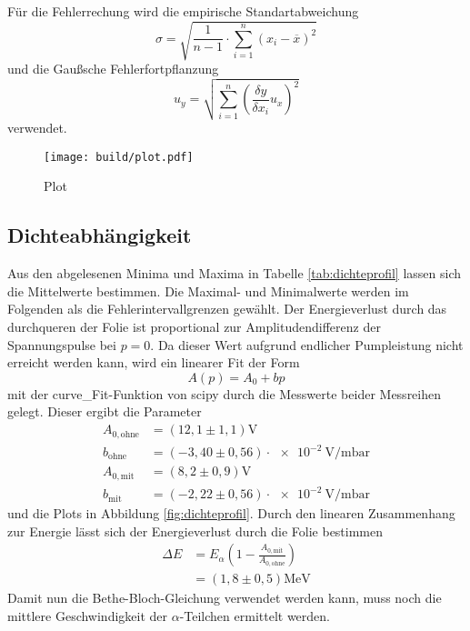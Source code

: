 Für die Fehlerrechung wird die empirische Standartabweichung
\begin{equation}
  \sigma = \sqrt{\frac{1}{n-1} \cdot \sum_{i=1}^n(x_i-\overline{x})^2}
  \label{eqn:Stdabweichung}
\end{equation}
und die Gaußsche Fehlerfortpflanzung
\begin{equation}
  u_y = \sqrt{\sum_{i=1}^n\left(\frac{\delta y}{\delta x_i}u_x\right)^2}
  \label{eqn:gauß}
\end{equation}
verwendet.
\begin{figure}
  \centering
  \texttt{[image: build/plot.pdf]}
  \caption{Plot}
  \label{fig:plot}
\end{figure}

\subsection{Dichteabhängigkeit}
Aus den abgelesenen Minima und Maxima in Tabelle \ref{tab:dichteprofil} lassen sich die Mittelwerte bestimmen.
Die Maximal- und Minimalwerte werden im Folgenden als die Fehlerintervallgrenzen gewählt.
Der Energieverlust durch das durchqueren der Folie ist proportional zur Amplitudendifferenz der Spannungspulse bei $p=0$.
Da dieser Wert aufgrund endlicher Pumpleistung nicht erreicht werden kann,
wird ein linearer Fit der Form
\begin{equation}
  A(p) = A_0 + bp
\end{equation}
mit der curve\_Fit-Funktion von scipy \cite{scipy} durch die Messwerte beider Messreihen gelegt.
Dieser ergibt die Parameter
\begin{align}
  A_{0,\text{ohne}} &= (12,1 \pm 1,1)\si{\volt}\\
  b_{\text{ohne}}   &= (-3,40 \pm 0,56)\cdot\SI{e-2}{\volt\per\milli\bar}\\
  A_{0,\text{mit}} &= (8,2 \pm 0,9)\si{\volt}\\
  b_{\text{mit}}   &= (-2,22 \pm 0,56)\cdot\SI{e-2}{\volt\per\milli\bar}
\end{align}
und die Plots in Abbildung \ref{fig:dichteprofil}.
Durch den linearen Zusammenhang zur Energie lässt sich der Energieverlust durch die Folie bestimmen
\begin{align}
  \Delta E &= E_{\alpha}\left(1-\frac{A_{0,\text{mit}}}{A_{0,\text{ohne}}}\right)\\
           &= (1,8 \pm 0,5)\si{\mega\electronvolt}
\end{align}
Damit nun die Bethe-Bloch-Gleichung verwendet werden kann, muss noch die mittlere Geschwindigkeit der $\alpha$-Teilchen ermittelt werden.
